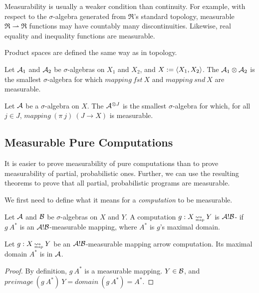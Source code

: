 \documentclass[preprint]{sigplanconf}
\newcommand{\arrow}{\rightsquigarrow}
\newcommand{\pto}{\rightharpoonup}
\newcommand{\map}{_\mathrm{map}}
\DeclareMathOperator{\mapto}{\arrow_{\mspace{-21mu}\map}}
\begin{document}
Measurability is usually a weaker condition than continuity.
For example, with respect to the $\sigma$-algebra generated from $\Re$'s standard topology, measurable $\Re \pto \Re$ functions may have countably many discontinuities.
Likewise, real equality and inequality functions are measurable.

Product spaces are defined the same way as in topology.

\begin{definition}
Let $\mathcal{A}_1$ and $\mathcal{A}_2$ be $\sigma$-algebras on $X_1$ and $X_2$, and $X := \langle{X_1,X_2}\rangle$.
The  $\mathcal{A}_1 \otimes \mathcal{A}_2$ is the smallest $\sigma$-algebra for which $mapping~fst~X$ and $mapping~snd~X$ are measurable.
\label{def:finite-product-sigma-algebra}
\end{definition}

\begin{definition}
Let $\mathcal{A}$ be a $\sigma$-algebra on $X$.
The  $\mathcal{A}^{\otimes J}$ is the smallest $\sigma$-algebra for which, for all $j \in J$, $mapping~(\pi~j)~(J \to X)$ is measurable.
\label{def:arbitrary-product-sigma-algebra}
\end{definition}

\subsection{Measurable Pure Computations}

It is easier to prove measurability of pure computations than to prove measurability of partial, probabilistic ones.
Further, we can use the resulting theorems to prove that all partial, probabilistic programs are measurable.

We first need to define what it means for a \emph{computation} to be measurable.

\begin{definition}
Let $\mathcal{A}$ and $\mathcal{B}$ be $\sigma$-algebras on $X$ and $Y$.
A computation $g : X \mapto Y$ is $\mathcal{A}!\mathcal{B}$- if $g~A^*$ is an $\mathcal{A}!\mathcal{B}$-measurable mapping, where $A^*$ is $g$'s maximal domain.
\label{def:measurable-mapping-arrow-computation}
\end{definition}

\begin{theorem}
Let $g : X \mapto Y$ be an $\mathcal{A}!\mathcal{B}$-measurable mapping arrow computation.
Its maximal domain $A^*$ is in $\mathcal{A}$.
\end{theorem}
\begin{proof}
By definition, $g~A^*$ is a measurable mapping. $Y \in \mathcal{B}$, and $preimage~(g~A^*)~Y = domain~(g~A^*) = A^*$.
\end{proof}
\end{document}
